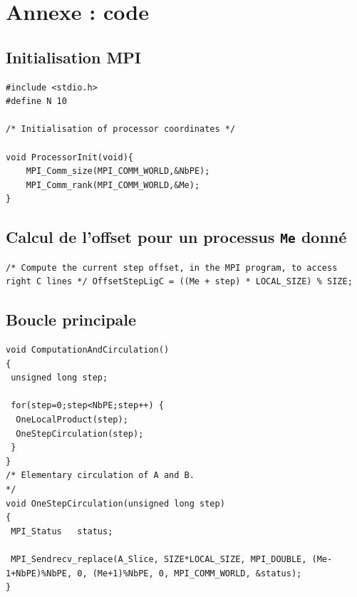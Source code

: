 \documentclass[	DIV=calc,%
							paper=a4,%
							fontsize=11pt%
							]{scrartcl}	 					%
\begin{document}
\section{Annexe : code}

\subsection*{Initialisation MPI}
\begin{lstlisting}
#include <stdio.h>
#define N 10

/* Initialisation of processor coordinates */

void ProcessorInit(void){
	MPI_Comm_size(MPI_COMM_WORLD,&NbPE);
  	MPI_Comm_rank(MPI_COMM_WORLD,&Me);
}
\end{lstlisting}

\newpage

\subsection*{Calcul de l'offset pour un processus {\texttt{Me} donné}}
\begin{lstlisting}
/* Compute the current step offset, in the MPI program, to access right C lines */ OffsetStepLigC = ((Me + step) * LOCAL_SIZE) % SIZE; 
\end{lstlisting}

\subsection*{Boucle principale}
\begin{lstlisting}
void ComputationAndCirculation()
{
 unsigned long step;
 
 for(step=0;step<NbPE;step++) { 
  OneLocalProduct(step);
  OneStepCirculation(step);
 }
}
/* Elementary circulation of A and B.                                            */
void OneStepCirculation(unsigned long step)
{
 MPI_Status   status;

 MPI_Sendrecv_replace(A_Slice, SIZE*LOCAL_SIZE, MPI_DOUBLE, (Me-1+NbPE)%NbPE, 0, (Me+1)%NbPE, 0, MPI_COMM_WORLD, &status);
}


\end{lstlisting} 
\end{document}

